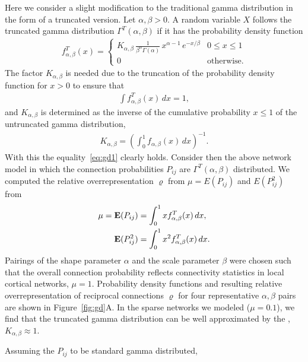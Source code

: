 Here we consider a slight modification to the traditional gamma
distribution in the form of a truncated version. Let $\alpha, \beta >
0$. A random variable $X$ follows the truncated gamma distribution
$\Gamma^T(\alpha, \beta)$ if it has the probability density function
%
\begin{align}
  f_{\alpha,\beta}^T(x) = \begin{cases} K_{\alpha, \beta}\,
\frac{1}{\beta^{\alpha}\Gamma(\alpha)}\, x^{\alpha-1}\,e^{-x/\beta} & 0 \leq x \leq 1 \\
0 & \text{otherwise}.
\end{cases}
\end{align}
%
The factor $K_{\alpha,\beta}$ is needed due to the truncation of the
probability density function for $x>0$ to ensure that
\begin{align}
  \int f_{\alpha,\beta}^T(x) \,dx = 1 \label{eq:gd1},
\end{align}
and $K_{\alpha,\beta}$ is determined as the inverse of the cumulative
probability $x \leq 1$ of the untruncated gamma distribution,
\begin{align}
  K_{\alpha,\beta} = \left(\int_0^{1} f_{\alpha,\beta}(x) \, dx \right)^{-1}.
\end{align}
With this the equality~\eqref{eq:gd1} clearly holds. Consider then the
above network model in which the connection probabilities $P_{ij}$ are
$\Gamma^T(\alpha, \beta)$ distributed. We computed the relative
overrepresentation $\varrho$ from $\mu = E(P_{ij})$ and $E(P_{ij}^2)$
from
\begin{align}
  \mu = \operatorname{\mathbf{E}}(P_{ij}) &= \int_0^1 x f_{\alpha,\beta}^T(x)\, dx,\\
        \operatorname{\mathbf{E}}(P_{ij}^2) &= \int_0^1 x^2 f_{\alpha,\beta}^T(x)\, dx.
\end{align}
Pairings of the shape parameter $\alpha$ and the scale parameter
$\beta$ were chosen such that the overall connection probability
reflects connectivity statistics in local cortical networks, $\mu =
1$. Probability density functions and resulting relative
overrepresentation of reciprocal connections $\varrho$ for four
representative $\alpha,\beta$ pairs are shown in
Figure~\ref{fig:gd}A. In the sparse networks we modeled ($\mu = 0.1$),
we find that the truncated gamma distribution can be well approximated
by the , $K_{\alpha, \beta} \approx 1$.

Assuming the $P_{ij}$ to be standard gamma distributed, 

